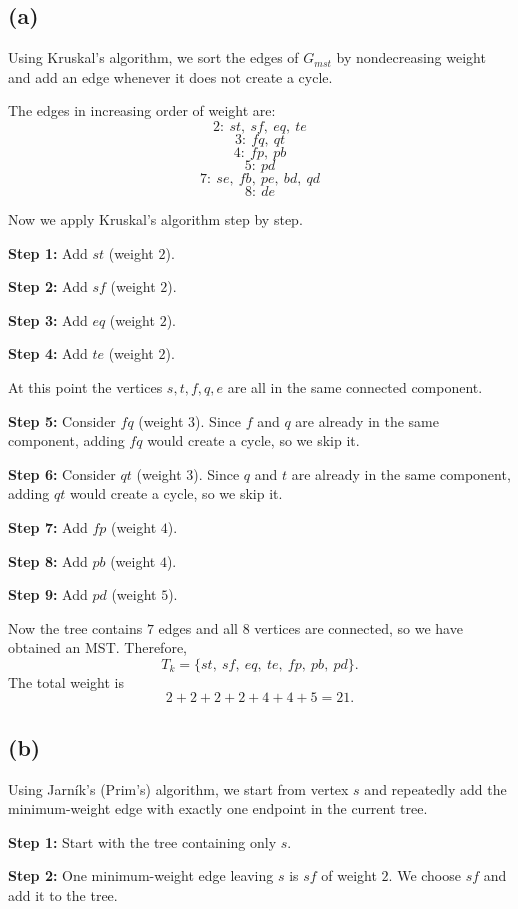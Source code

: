 \documentclass{brockcosc3p03}
\begin{document}
\subsection*{(a)}

Using Kruskal's algorithm, we sort the edges of $G_{mst}$ by nondecreasing weight and add an edge whenever it does not create a cycle.

The edges in increasing order of weight are:
\[
2: \ st,\ sf,\ eq,\ te
\]
\[
3: \ fq,\ qt
\]
\[
4: \ fp,\ pb
\]
\[
5: \ pd
\]
\[
7: \ se,\ fb,\ pe,\ bd,\ qd
\]
\[
8: \ de
\]

Now we apply Kruskal's algorithm step by step.

\textbf{Step 1:} Add $st$ (weight $2$).

\textbf{Step 2:} Add $sf$ (weight $2$).

\textbf{Step 3:} Add $eq$ (weight $2$).

\textbf{Step 4:} Add $te$ (weight $2$).

At this point the vertices $s,t,f,q,e$ are all in the same connected component.

\textbf{Step 5:} Consider $fq$ (weight $3$). Since $f$ and $q$ are already in the same component, adding $fq$ would create a cycle, so we skip it.

\textbf{Step 6:} Consider $qt$ (weight $3$). Since $q$ and $t$ are already in the same component, adding $qt$ would create a cycle, so we skip it.

\textbf{Step 7:} Add $fp$ (weight $4$).

\textbf{Step 8:} Add $pb$ (weight $4$).

\textbf{Step 9:} Add $pd$ (weight $5$).

Now the tree contains $7$ edges and all $8$ vertices are connected, so we have obtained an MST. Therefore,
\[
T_k = \{st,\ sf,\ eq,\ te,\ fp,\ pb,\ pd\}.
\]
The total weight is
\[
2+2+2+2+4+4+5 = 21.
\]

\subsection*{(b)}

Using Jarn\'ik's (Prim's) algorithm, we start from vertex $s$ and repeatedly add the minimum-weight edge with exactly one endpoint in the current tree.

\textbf{Step 1:} Start with the tree containing only $s$.

\textbf{Step 2:} One minimum-weight edge leaving $s$ is $sf$ of weight $2$. We choose $sf$ and add it to the tree.
\end{document}
